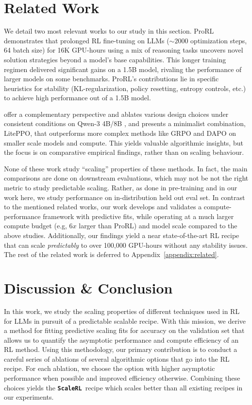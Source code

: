 \documentclass[]{fairmeta} %
\newcommand{\scalerl}{\texttt{\textbf{ScaleRL}}}
\begin{document}
\section{Related Work}
\label{sec:related}

We detail two most relevant works to our study in this section. ProRL \citep{prorl} demonstrates that prolonged RL fine-tuning on LLMs ($\sim2000$ optimization steps, 64 batch size) for 16K GPU-hours using a mix of reasoning tasks uncovers novel solution strategies beyond a model's base capabilities. This longer training regimen delivered significant gains on a 1.5B model, rivaling the performance of larger models on some benchmarks. ProRL's contributions lie in specific heuristics for stability (KL-regularization, policy resetting, entropy controls, etc.) to achieve high performance out of a 1.5B model. 

\citet{tricks_traps} offer a complementary perspective and ablates various design choices under consistent conditions on Qwen-3 4B/8B \citep{qwen3technicalreport}, and presents a minimalist combination, LitePPO, that outperforms more complex methods like GRPO \citep{shao2024deepseekmath} and DAPO \citep{yu2025dapo} on smaller scale models and compute. This yields valuable algorithmic insights, but the focus is on comparative empirical findings, rather than on scaling behaviour. 

None of these work study ``scaling'' properties of these methods. In fact, the main comparisons are done on downstream evaluations, which may not be not the right metric to study predictable scaling. Rather, as done in pre-training and in our work here,  we study performance on in-distribution held out eval set. In contrast to the mentioned related works, our work develops and validates a compute-performance framework with predictive fits, while operating at a much larger compute budget (e.g, $6x$ larger than ProRL) and model scale compared to the above studies. 
Additionally, our findings yield a near state-of-the-art RL recipe that can scale \emph{predictably} to over 100,000 GPU-hours without any stability issues. The rest of the related work is deferred to Appendix~\ref{appendix:related}.


\section{Discussion \& Conclusion}
\label{sec:conclusion}

In this work, we study the scaling properties of different techniques used in RL for LLMs in pursuit of a predictable scalable recipe. With this mission, we derive a method for fitting predictive scaling fits for accuracy on the validation set that allows us to quantify the asymptotic performance and compute efficiency of an RL method. Using this methodology, our primary contribution is to conduct a careful series of ablations of several algorithmic options that go into the RL recipe.
For each ablation, we choose the option with higher asymptotic performance when possible and improved efficiency otherwise. 
Combining these choices yields the \scalerl\ recipe which scales better than all existing recipes in our experiments.
\end{document}
